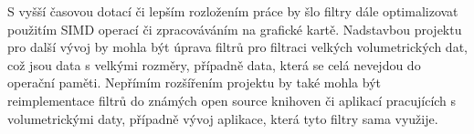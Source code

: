 S vyšší časovou dotací či lepším rozložením práce by šlo filtry dále optimalizovat použitím SIMD operací či zpracováváním na grafické kartě. Nadstavbou projektu pro další vývoj by mohla být úprava filtrů pro filtraci velkých volumetrických dat, což jsou data s velkými rozměry, případně data, která se celá nevejdou do operační paměti.
Nepřímím rozšířením projektu by také mohla být reimplementace filtrů do známých open source knihoven či aplikací pracujících s volumetrickými daty, případně vývoj aplikace, která tyto filtry sama využije. 